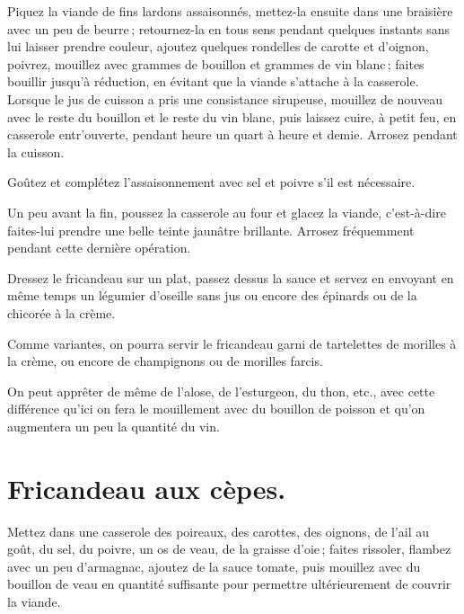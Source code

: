 Piquez la viande de fins lardons assaisonnés, mettez-la ensuite dans une
braisière avec un peu de beurre ; retournez-la en tous sens pendant quelques
instants sans lui laisser prendre couleur, ajoutez quelques rondelles de
carotte et d'oignon, poivrez, mouillez avec {\mmm} grammes de bouillon
et {\mmm} grammes de vin blanc ; faites bouillir jusqu'à réduction, en évitant que
la viande s'attache à la casserole. Lorsque le jus de cuisson a pris une
consistance sirupeuse, mouillez de nouveau avec le reste du bouillon et le
reste du vin blanc, puis laissez cuire, à petit feu, en casserole entr'ouverte,
pendant {\mmm} heure un quart à {\mmm} heure et demie. Arrosez
pendant la cuisson.

Goûtez et complétez l'assaisonnement avec sel et poivre s'il est nécessaire.

Un peu avant la fin, poussez la casserole au four et glacez la viande,
c'est-à-dire faites-lui prendre une belle teinte jaunâtre brillante. Arrosez
fréquemment pendant cette dernière opération.

Dressez le fricandeau sur un plat, passez dessus la sauce et servez en envoyant
en même temps un légumier d'oseille sans jus ou encore des épinards ou de la
chicorée à la crème.

\sk

Comme variantes, on pourra servir le fricandeau garni de tartelettes de morilles
à la crème, ou encore de champignons ou de morilles farcis.

\sk

On peut apprêter de même de l'alose, de l’esturgeon, du thon, etc., avec cette
différence qu'ici on fera le mouillement avec du bouillon de poisson et qu'on
augmentera un peu la quantité du vin.

\section*{\centering Fricandeau aux cèpes.}
{}

Mettez dans une casserole des poireaux, des carottes, des oignons, de l'ail au
goût, du sel, du poivre, un os de veau, de la graisse d'oie ; faites rissoler,
flambez avec un peu d'armagnac, ajoutez de la sauce tomate, puis mouillez avec
du bouillon de veau en quantité suffisante pour permettre ultérieurement de
couvrir la viande.

